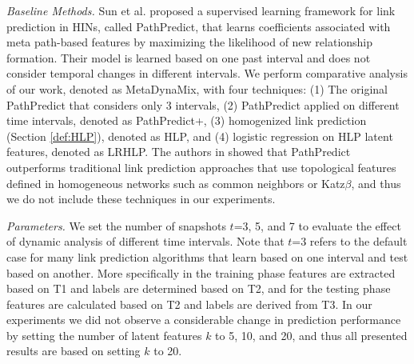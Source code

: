 



\textit{Baseline Methods.} Sun et al. \cite{sun2011ASONAM} proposed a supervised learning framework for link prediction in HINs, called {PathPredict}, that learns coefficients associated with meta path-based features by maximizing the likelihood of new relationship formation. Their model is learned based on one past interval and does not consider temporal changes in different intervals. We perform comparative analysis of our work, denoted as {MetaDynaMix}, with four techniques: (1) The original {PathPredict} that considers only 3 intervals, (2) PathPredict applied on different time intervals, denoted as {PathPredict+}, (3) homogenized link prediction (Section \ref{def:HLP}), denoted as {HLP}, and (4) logistic regression on HLP latent features, denoted as {LRHLP}. %
The authors in \cite{sun2011ASONAM} showed that {PathPredict} outperforms traditional link prediction approaches that use topological features defined in homogeneous networks such as common neighbors or Katz$\beta$, and thus we do not include these techniques in our experiments.




\textit{Parameters.} We set the number of snapshots $t$=3, 5, and 7 to evaluate the effect of dynamic analysis of different time intervals. Note that $t$=3 refers to the default case for many link prediction algorithms that learn based on one interval and test based on another. More specifically in the training phase features are extracted based on T1 and labels are determined based on T2, and for the testing phase features are calculated based on T2 and labels are derived from T3. In our experiments we did not observe a considerable change in prediction performance by setting the number of latent features $k$ to 5, 10, and 20, and thus all presented results are based on setting $k$ to 20. %

